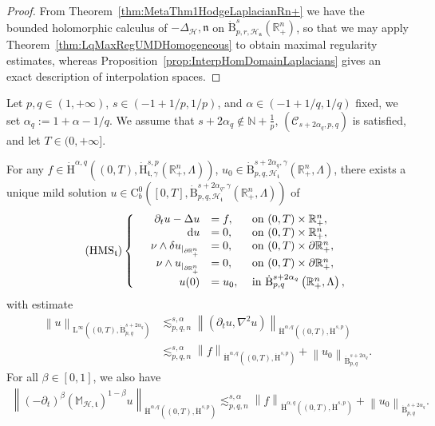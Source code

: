 \documentclass[AHL,Unicode,longabstracts,published]{cedram}
\newcommand{\bbR}{\mathbb{R}}
\newcommand{\bbN}{\mathbb{N}}
\newcommand{\bbM}{\mathbb{M}}
\newcommand{\rmH}{\mathrm{H}}%
\newcommand{\rmB}{\mathrm{B}}
\newcommand{\rmd}{\mathrm{d}}
\newcommand{\rmL}{\mathrm{L}}
\newcommand{\rmC}{\mathrm{C}}
\newcommand{\clH}{\mathcal{H}}
\newcommand{\clC}{\mathcal{C}}
\newcommand{\fkn}{\mathfrak{n}}
\newcommand{\fkt}{\mathfrak{t}}
\begin{document}
\begin{proof}
From Theorem~\ref{thm:MetaThm1HodgeLaplacianRn+} we have the bounded holomorphic calculus of $-\Delta_\clH,\fkn$ on $\dot{\rmB}^{s}_{p,r,\clH_{\fkn}}(\bbR^n_+)$, so that we may apply Theorem~\ref{thm:LqMaxRegUMDHomogeneous} to obtain maximal regularity estimates, whereas Proposition~\ref{prop:InterpHomDomainLaplacians} gives an exact description of interpolation spaces.
\end{proof}


\begin{theo}\label{thm:MaxRxHspUMDHodgeStokesRn+}
Let $p,q\in(1,+\infty)$, $s\in(-1+1/p,1/p)$, and $\alpha\in(-1+1/q,1/q)$ fixed, we set $\alpha_q:= 1+\alpha-1/q$. We assume that $s+2\alpha_q\notin \bbN +\frac{1}{p}$, $(\clC_{s+2\alpha_q,p,q})$ is satisfied, and let $T\in(0,+\infty]$.

For any $f\in \dot{\rmH}^{\alpha,q}((0,T),\dot{\rmH}^{s,p}_{\fkt,\gamma}(\bbR^n_+,\Lambda))$, $u_0\in \dot{\rmB}^{s+2\alpha_q,\gamma}_{p,q,\clH_\fkt}(\bbR^n_+,\Lambda)$, there exists a unique mild solution $u \in \rmC ^0_b([0,T],\dot{\rmB}^{s+2\alpha_q,\gamma}_{p,q,\clH_\fkt}(\bbR^n_+,\Lambda))$ of
\begin{equation}
\tag{HMS${}_{\fkt}$}\label{eq:HodgeMaxwellBCSystem}
\left\{
\begin{array}{rrll}
&{\partial_t u - \Delta u}  &{= f,} &{\text{ on } (0,T)\times\bbR^n_+,}\\
&{\rmd u} &{=  0,} &{\text{ on } (0,T)\times\bbR^n_+,}\\
&{\nu\wedge\delta u_{|_{\partial\bbR^n_+}}} &{= 0,} 
&{\text{ on } (0,T)\times\partial\bbR^n_+,}\\
&{\nu\wedge u_{|_{\partial\bbR^n_+}}} &{=  0,}
&{\text{ on } (0,T)\times\partial\bbR^n_+,}\\
&{u(0)} &{=  u_0,} &{\text{ in } \dot{\rmB}^{s+2\alpha_q}_{p,q}\left(\bbR^n_+,\Lambda\right),}
\end{array}\right.
\end{equation}
with estimate
\begin{align*}
\left\| u \right\|_{\rmL^\infty((0,T),\dot{\rmB}^{s+2\alpha_q}_{p,q})} &\lesssim_{p,q,n}^{s,\alpha} \left\| \left(\partial_t u, \nabla^2 u\right) \right\|_{\dot{\rmH}^{\alpha,q}\left((0,T),\dot{\rmH}^{s,p}\right)}\\&
\lesssim_{p,q,n}^{s,\alpha} \left\| f \right\|_{\dot{\rmH}^{\alpha,q}\left((0,T),\dot{\rmH}^{s,p}\right)} + \left\| u_0 \right\|_{\dot{\rmB}^{s+2\alpha_q}_{p,q}}.
\end{align*}
For all $\beta\in[0,1]$, we also have
\begin{align}\label{eq:fractionalEstimatePruss2}
\left\| \left(-\partial_t\right)^{\beta}\left(\bbM_\mathcal{H,\fkt}\right)^{1-\beta} u \right\|_{\dot{\rmH}^{\alpha,q}\left((0,T),\dot{\rmH}^{s,p}\right)} \lesssim_{p,q,n}^{s,\alpha} \left\| f \right\|_{\dot{\rmH}^{\alpha,q}\left((0,T),\dot{\rmH}^{s,p}\right)} + \left\| u_0 \right\|_{\dot{\rmB}^{s+2\alpha_q}_{p,q}}.
\end{align}
\end{theo}
\end{document}
